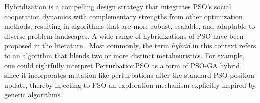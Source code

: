 {%







Hybridization is a compelling design strategy that integrates PSO’s social cooperation dynamics with complementary strengths from other optimization methods, resulting in algorithms that are more robust, scalable, and adaptable to diverse problem landscapes.
A wide range of hybridizations of PSO have been proposed in the literature \citep[see, e.g.,][]{chauhan2025learning,abualigah2025particle,urbanczyk2025sequential}.
Most commonly, the term \textit{hybrid} in this context refers to an algorithm that blends two or more distinct \glspl{metaheuristic}.
For example, one could rightfully interpret PerturbationPSO as a form of PSO-GA hybrid,
since it incorporates mutation\-\mbox{-like} perturbations after the standard PSO position update, thereby injecting to PSO an exploration mechanism explicitly inspired by genetic algorithms.


}
